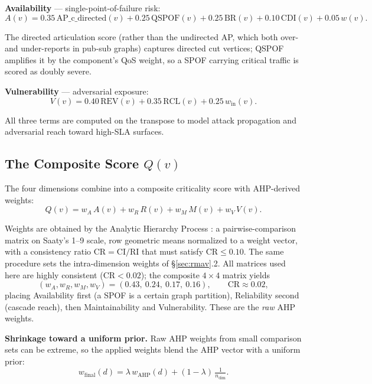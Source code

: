 \documentclass[review]{elsarticle}
\begin{document}
\textbf{Availability} --- single-point-of-failure risk:
\begin{equation}
A(v) = 0.35\,\mathrm{AP\_c\_directed}(v) + 0.25\,\mathrm{QSPOF}(v) + 0.25\,\mathrm{BR}(v)
+ 0.10\,\mathrm{CDI}(v) + 0.05\,w(v).
\end{equation}

The directed articulation score (rather than the undirected AP, which both over- and under-reports
in pub-sub graphs) captures directed cut vertices; QSPOF amplifies it by the component's QoS weight,
so a SPOF carrying critical traffic is scored as doubly severe.

\textbf{Vulnerability} --- adversarial exposure:
\begin{equation}
V(v) = 0.40\,\mathrm{REV}(v) + 0.35\,\mathrm{RCL}(v) + 0.25\,w_{\text{in}}(v).
\end{equation}

All three terms are computed on the transpose to model attack propagation and adversarial reach
toward high-SLA surfaces.

\subsection{The Composite Score $Q(v)$}

The four dimensions combine into a composite criticality score with AHP-derived weights:
\begin{equation}
Q(v) = w_A\,A(v) + w_R\,R(v) + w_M\,M(v) + w_V\,V(v).
\end{equation}

Weights are obtained by the Analytic Hierarchy Process \cite{Saaty1980}: a pairwise-comparison
matrix on Saaty's 1--9 scale, row geometric means normalized to a weight vector, with a consistency
ratio $\mathrm{CR} = \mathrm{CI}/\mathrm{RI}$ that must satisfy $\mathrm{CR}\le 0.10$. The same
procedure sets the intra-dimension weights of \S\ref{sec:rmav}.2. All matrices used here are highly
consistent ($\mathrm{CR} < 0.02$); the composite $4\times4$ matrix yields
\begin{equation}
(w_A, w_R, w_M, w_V) = (0.43,\ 0.24,\ 0.17,\ 0.16), \qquad \mathrm{CR}\approx 0.02,
\end{equation}
placing Availability first (a SPOF is a certain graph partition), Reliability second (cascade
reach), then Maintainability and Vulnerability. These are the \emph{raw} AHP weights.

\textbf{Shrinkage toward a uniform prior.} Raw AHP weights from small comparison sets can be
extreme, so the applied weights blend the AHP vector with a uniform prior:
\begin{equation}
w_{\text{final}}(d) = \lambda\,w_{\mathrm{AHP}}(d) + (1-\lambda)\,\tfrac{1}{n_{\text{dim}}}.
\end{equation}
\end{document}
